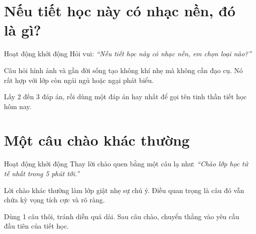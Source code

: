 \section{Nếu tiết học này có nhạc nền, đó là gì?}
\begin{khoidongbox}{Hoạt động khởi động}
Hỏi vui: \textit{``Nếu tiết học này có nhạc nền, em chọn loại nào?''}
\end{khoidongbox}
\begin{visaohieuqua}
Câu hỏi hình ảnh và gần đời sống tạo không khí nhẹ mà không cần đạo cụ. Nó rất hợp với lớp còn ngái ngủ hoặc ngại phát biểu.
\end{visaohieuqua}
\begin{cachlam5phut}
Lấy 2 đến 3 đáp án, rồi dùng một đáp án hay nhất để gọi tên tinh thần tiết học hôm nay.
\end{cachlam5phut}
\ngancach

\section{Một câu chào khác thường}
\begin{khoidongbox}{Hoạt động khởi động}
Thay lời chào quen bằng một câu lạ như: \textit{``Chào lớp học tử tế nhất trong 5 phút tới.''}
\end{khoidongbox}
\begin{visaohieuqua}
Lời chào khác thường làm lớp giật nhẹ sự chú ý. Điều quan trọng là câu đó vẫn chứa kỳ vọng tích cực và rõ ràng.
\end{visaohieuqua}
\begin{cachlam5phut}
Dùng 1 câu thôi, tránh diễn quá dài. Sau câu chào, chuyển thẳng vào yêu cầu đầu tiên của tiết học.
\end{cachlam5phut}